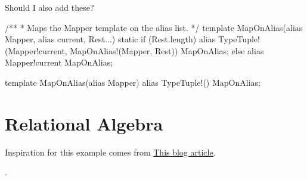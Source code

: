Should I also add these?

\begin{dcode}
/**
 * Maps the Mapper template on the alias list.
 */
template MapOnAlias(alias Mapper, alias current, Rest...)
{
    static if (Rest.length)
        alias TypeTuple!(Mapper!current, MapOnAlias!(Mapper, Rest)) MapOnAlias;
    else
        alias Mapper!current MapOnAlias;
}

template MapOnAlias(alias Mapper)
{
    alias TypeTuple!() MapOnAlias;
}
\end{dcode}

\section{Relational Algebra}\label{relationalalgebra}

Inspiration for this example comes from \href{http://david.rothlis.net/d/templates}{This blog article}.

.

